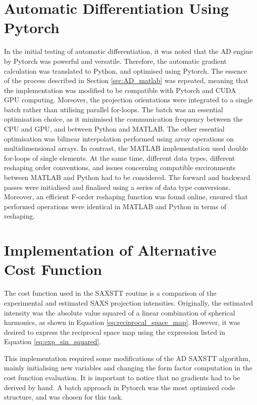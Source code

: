 \section{Automatic Differentiation Using Pytorch}\label{sec:AD_pytorch}

In the initial testing of automatic differentiation, it was noted that the AD engine by Pytorch was powerful and versatile.
Therefore, the automatic gradient calculation was translated to Python, and optimised using Pytorch.
The essence of the process described in Section \ref{sec:AD_matlab} was repeated,
meaning that the implementation was modified to be compatible with Pytorch and CUDA GPU computing.
Moreover, the projection orientations were integrated to a single batch rather than utilising parallel for-loops.
The batch was an essential optimisation choice, as it minimised the communication frequency between the CPU and GPU, and between Python and MATLAB.
The other essential optimisation was bilinear interpolation performed using array operations on multidimensional arrays.
In contrast, the MATLAB implementation used double for-loops of single elements.
At the same time, different data types, different reshaping order conventions, and issues concerning compatible environments between MATLAB and Python had to be considered.
The forward and backward passes were initialised and finalised using a series of data type conversions.
Moreover, an efficient F-order reshaping function was found online, ensured that performed operations were identical in MATLAB and Python in terms of reshaping.

\section{Implementation of Alternative Cost Function}\label{sec:alternative_cost_function}

The cost function used in the SAXSTT routine is a comparison of the experimental and estimated SAXS projection intensities.
Originally, the estimated intensity was the absolute value squared of a linear combination of spherical harmonics, as shown in Equation \eqref{eq:reciprocal_space_map}.
However, it was desired to express the reciprocal space map using the expression listed in Equation \eqref{eq:exp_sin_squared}.

\noindent
This implementation required some modifications of the AD SAXSTT algorithm, mainly initialising new variables and changing the form factor computation in the cost function evaluation.
It is important to notice that no gradients had to be derived by hand.
A batch approach in Pytorch was the most optimised code structure, and was chosen for this task.

